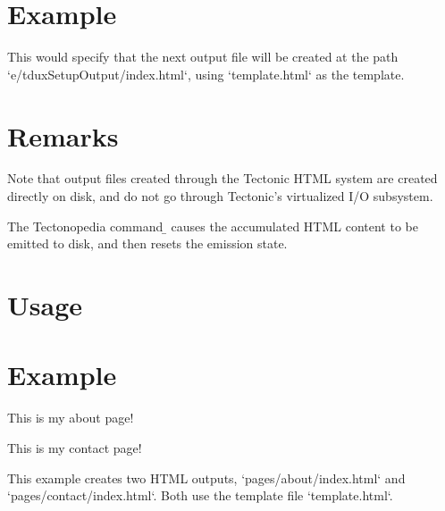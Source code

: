 \section*{Example}

\begin{texdisp}
\end{texdisp}

This would specify that the next output file will be created at the path
\tex`e/tduxSetupOutput/index.html`, using \tex`template.html` as the template.

\section*{Remarks}

Note that output files created through the Tectonic HTML system are created
directly on disk, and do not go through Tectonic’s virtualized I/O subsystem.

\tduxEmit



The Tectonopedia command \b{\string\tduxEmit} causes the accumulated HTML
content to be emitted to disk, and then resets the emission state.

\section*{Usage}

\begin{texdisp}
\tduxEmit
\end{texdisp}

\section*{Example}

\begin{texdisp}

This is my about page!
\tduxEmit

This is my contact page!
\tduxEmit
\end{texdisp}

This example creates two HTML outputs, \tex`pages/about/index.html` and
\tex`pages/contact/index.html`. Both use the template file \tex`template.html`.

